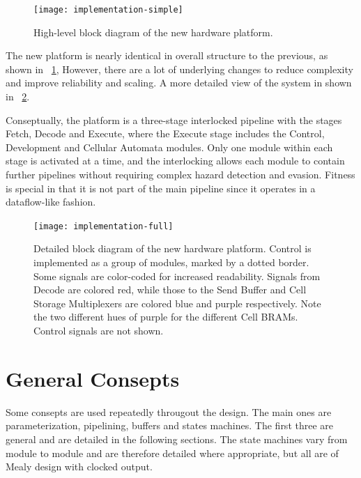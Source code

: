 \begin{figure}[!ht]
    \centering
    \texttt{[image: implementation-simple]}
    \caption[High-level system diagram]{
        High-level block diagram of the new hardware platform.
    }
    \label{fig:implementation-simple}
\end{figure}


The new platform is nearly identical in overall structure to the previous, as shown in \figurename~\ref{fig:implementation-simple},
However, there are a lot of underlying changes to reduce complexity and improve reliability and scaling.
A more detailed view of the system in shown in \figurename~\ref{fig:implementation-full}.

Conseptually, the platform is a three-stage interlocked pipeline with the stages Fetch, Decode and Execute, where the Execute stage includes the Control, Development and Cellular Automata modules.
Only one module within each stage is activated at a time, and the interlocking allows each module to contain further pipelines without requiring complex hazard detection and evasion.
Fitness is special in that it is not part of the main pipeline since it operates in a dataflow-like fashion.

\begin{figure}
    \centering
    \texttt{[image: implementation-full]}
    \caption[Detailed system diagram]{
        Detailed block diagram of the new hardware platform.
        Control is implemented as a group of modules, marked by a dotted border.
        Some signals are color-coded for increased readability.
        Signals from Decode are colored red, while those to the Send Buffer and Cell Storage Multiplexers are colored blue and purple respectively.
        Note the two different hues of purple for the different Cell BRAMs.
        Control signals are not shown.
    }
    \label{fig:implementation-full}
\end{figure}


\section{General Consepts}

Some consepts are used repeatedly througout the design.
The main ones are parameterization, pipelining, buffers and states machines.
The first three are general and are detailed in the following sections.
The state machines vary from module to module and are therefore detailed where appropriate, but all are of Mealy design with clocked output.

